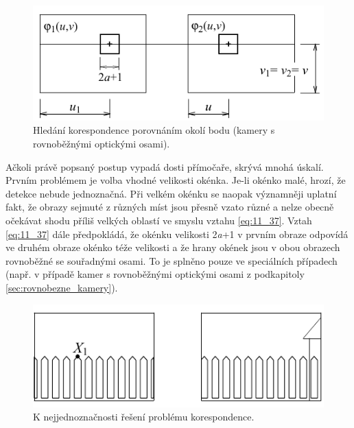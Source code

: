 \begin{figure}[th]
    \begin{center}
        \includegraphics[scale=.9]{11_stereo/images/img_11_7.pdf}
    \end{center}
    \caption{Hledání korespondence porovnáním okolí bodu (kamery s rovnoběžnými optickými osami).}
    \label{img:11_7}
\end{figure}

Ačkoli právě popsaný postup vypadá dosti přímočaře, skrývá mnohá úskalí. Prvním problémem je volba vhodné velikosti okénka. Je-li okénko malé, hrozí, že detekce nebude jednoznačná. Při velkém okénku se naopak významněji uplatní fakt, že obrazy sejmuté z různých míst jsou přesně vzato různé a nelze obecně očekávat shodu příliš velkých oblastí ve smyslu vztahu \eqref{eq:11_37}. Vztah \eqref{eq:11_37} dále předpokládá, že okénku velikosti  2\textit{a}+1 v prvním obraze odpovídá ve druhém obraze okénko téže velikosti a že hrany okének jsou v obou obrazech rovnoběžné se souřadnými osami. To je splněno pouze ve speciálních případech (např. v případě kamer s rovnoběžnými optickými osami z podkapitoly \ref{sec:rovnobezne_kamery}).

\begin{figure}[th]
    \begin{center}
        \includegraphics[scale=.9]{11_stereo/images/img_11_8.pdf}
    \end{center}
    \caption{K nejjednoznačnosti řešení problému korespondence.}
    \label{img:11_8}
\end{figure}


